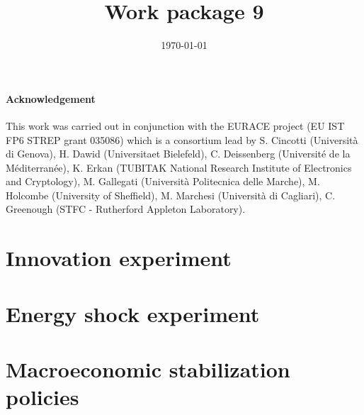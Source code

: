 \documentclass[a4paper,11pt]{book}
\begin{document}
\title{Work package 9}
\author{}
\date{\today}
\maketitle
\tableofcontents

\subsubsection*{Acknowledgement}
This work was carried out in conjunction with the EURACE project (EU IST FP6
STREP grant 035086) which is a consortium lead by S. Cincotti (Universit\`{a} di
Genova), H. Dawid (Universitaet Bielefeld), C. Deissenberg (Universit\'{e} de la
M\'{e}diterran\'{e}e), K. Erkan (TUBITAK National Research Institute of Electronics
and Cryptology), M. Gallegati  (Universit\`{a} Politecnica delle Marche), M.
Holcombe (University of Sheffield), M. Marchesi (Universit\`{a} di Cagliari), C.
Greenough (STFC - Rutherford Appleton Laboratory).


\chapter{Innovation experiment}
%

\chapter{Energy shock experiment}
\clearpage
\pagebreak
\pagebreak
\pagebreak
\pagebreak


\chapter{Macroeconomic stabilization policies}
\clearpage
\pagebreak
\pagebreak

\end{document}
